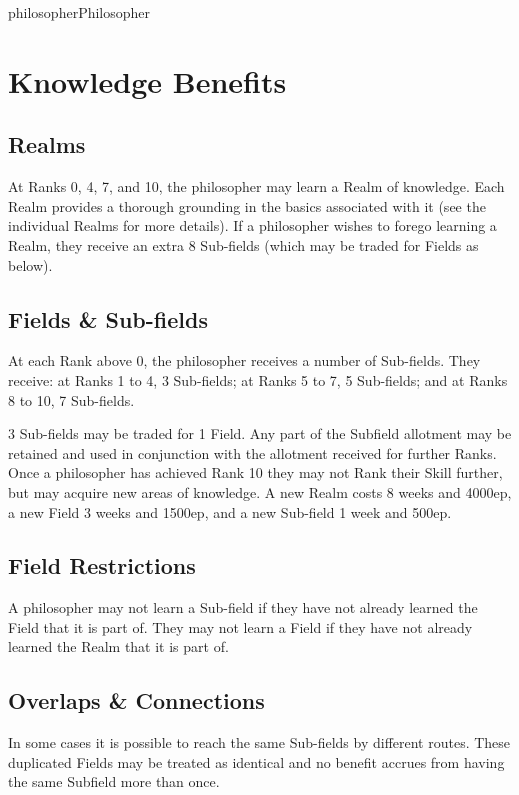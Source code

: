\begin{Skill}[2.0]{philosopher}{Philosopher}
\section{Knowledge Benefits}

\subsection{Realms}

At Ranks 0, 4, 7, and 10, the philosopher may learn a Realm of
knowledge.  Each Realm provides a thorough grounding in the basics
associated with it (see the individual Realms for more details).  If a
philosopher wishes to forego learning a Realm, they receive an extra 8
Sub-fields (which may be traded for Fields as below).

\subsection{Fields \& Sub-fields}

At each Rank above 0, the philosopher receives a number of Sub-fields.
They receive: at Ranks 1 to 4, 3 Sub-fields; at Ranks 5 to 7, 5
Sub-fields; and at Ranks 8 to 10, 7 Sub-fields.

3 Sub-fields may be traded for 1 Field.  Any part of the Subfield
allotment may be retained and used in conjunction with the allotment
received for further Ranks.  Once a philosopher has achieved Rank 10
they may not Rank their Skill further, but may acquire new areas of
knowledge.  A new Realm costs 8 weeks and 4000ep, a new Field 3 weeks
and 1500ep, and a new Sub-field 1 week and 500ep.

\subsection{Field Restrictions}

A philosopher may not learn a Sub-field if they have not already
learned the Field that it is part of.  They may not learn a Field if
they have not already learned the Realm that it is part of.

\subsection{Overlaps \& Connections}

In some cases it is possible to reach the same Sub-fields by different
routes.  These duplicated Fields may be treated as identical and no
benefit accrues from having the same Subfield more than once.


\end{Skill}
